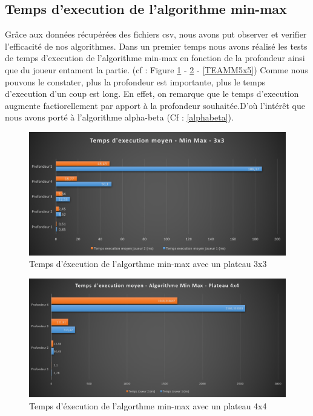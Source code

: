 \documentclass{report}
\begin{document}
	\subsection{Temps d'execution de l'algorithme min-max}
    Grâce aux données récupérées des fichiers csv, nous avons put observer et verifier l'efficacité de nos algorithmes.
	Dans un premier temps nous avons réalisé les tests de temps d'execution de l'algorithme min-max en fonction de la profondeur ainsi que du joueur entament la partie. (cf : Figure \ref{TEAMM3x3} - \ref{TEAMM4x4} - \ref{TEAMM5x5}) 
	Comme nous pouvons le constater, plus la profondeur est importante, plus le temps d'execution d'un coup est long. En effet, on remarque que le temps d'execution augmente factiorellement par apport à la profondeur souhaitée.D'où l'intérêt que nous avons porté à l'algorithme alpha-beta (Cf : \ref{alphabeta}).
	\begin{figure}[!t]
	    \caption{Temps d'éxecution de l'algorthme min-max avec un plateau 3x3}
	    \label{TEAMM3x3}
	    \includegraphics[scale=0.40]{tempsExecutionMinMax3x3.png}
	\end{figure}
     \begin{figure}[!t]
     	    \caption{Temps d'éxecution de l'algorthme min-max avec un plateau 4x4}
     	    \label{TEAMM4x4}
     	    \includegraphics[scale=0.40]{tempsExecutionMinMax4x4.png}
     \end{figure}
\end{document}
